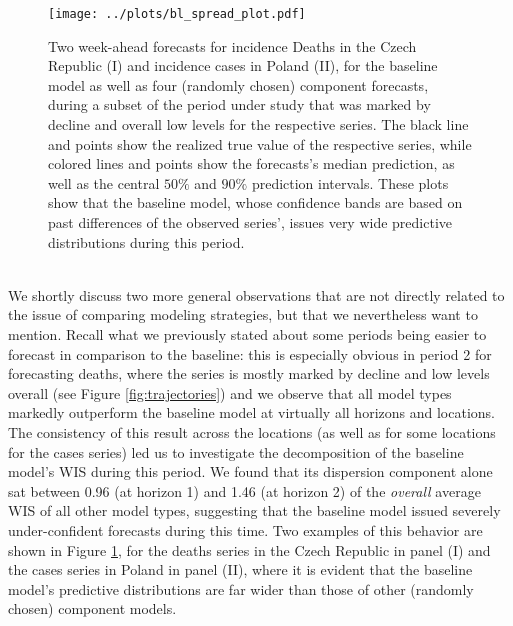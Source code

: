 \begin{figure}
\centering
\texttt{[image: ../plots/bl\_spread\_plot.pdf]}
\caption{Two week-ahead forecasts for incidence Deaths in the Czech Republic (I) and incidence cases in Poland (II), for the baseline model as well as four (randomly chosen) component forecasts, during a subset of the period under study that was marked by decline and overall low levels for the respective series. The black line and points show the realized true value of the respective series, while colored lines and points show the forecasts's median prediction, as well as the central $50\%$ and $90\%$ prediction intervals. These plots show that the baseline model, whose confidence bands are based on past differences of the observed series', issues very wide predictive distributions during this period.}
\label{fig:blspread}
\end{figure}\medskip\\ 
We shortly discuss two more general observations that are not directly related to the issue of comparing modeling strategies, but that we nevertheless want to mention. Recall what we previously stated about some periods being easier to forecast in comparison to the baseline: this is especially obvious in period 2 for forecasting deaths, where the series is mostly marked by decline and low levels overall (see Figure \ref{fig:trajectories}) and we observe that all model types markedly outperform the baseline model at virtually all horizons and locations. The consistency of this result across the locations (as well as for some locations for the cases series) led us to investigate the decomposition of the baseline model's WIS during this period. We found that its dispersion component alone sat between 0.96 (at horizon 1) and 1.46 (at horizon 2) of the \textit{overall} average WIS of all other model types, suggesting that the baseline model issued severely under-confident forecasts during this time. Two examples of this behavior are shown in Figure \ref{fig:blspread}, for the deaths series in the Czech Republic in panel (I) and the cases series in Poland in panel (II), where it is evident that the baseline model's predictive distributions are far wider than those of other (randomly chosen) component models.  %
